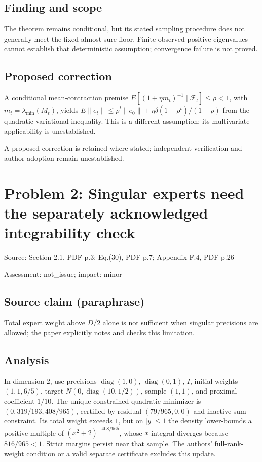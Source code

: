 \documentclass[11pt]{article}
\begin{document}
\subsection*{Finding and scope}

The theorem remains conditional, but its stated sampling procedure does not generally meet the fixed almost-sure floor. Finite observed positive eigenvalues cannot establish that deterministic assumption; convergence failure is not proved.

\subsection*{Proposed correction}

A conditional mean-contraction premise \(E[(1+\eta m_t)^{-1}\mid\mathcal F_t]\le\rho<1\), with \(m_t=\lambda_{\min}(M_t)\), yields \(E\|e_t\|\le\rho^t\|e_0\|+\eta\delta(1-\rho^t)/(1-\rho)\) from the quadratic variational inequality. This is a different assumption; its multivariate applicability is unestablished.

A proposed correction is retained where stated; independent verification and author adoption remain unestablished.

\section*{Problem 2: Singular experts need the separately acknowledged integrability check}

Source: Section 2.1, PDF p.3; Eq.(30), PDF p.7; Appendix F.4, PDF p.26

Assessment: not\_issue; impact: minor

\subsection*{Source claim (paraphrase)}

Total expert weight above \(D/2\) alone is not sufficient when singular precisions are allowed; the paper explicitly notes and checks this limitation.

\subsection*{Analysis}

In dimension \(2\), use precisions \(\operatorname{diag}(1,0)\), \(\operatorname{diag}(0,1)\), \(I\), initial weights \((1,1,6/5)\), target \(N(0,\operatorname{diag}(10,1/2))\), sample \((1,1)\), and proximal coefficient \(1/10\). The unique constrained quadratic minimizer is \((0,319/193,408/965)\), certified by residual \((79/965,0,0)\) and inactive sum constraint. Its total weight exceeds \(1\), but on \(|y|\le1\) the density lower-bounds a positive multiple of \((x^2+2)^{-408/965}\), whose \(x\)-integral diverges because \(816/965<1\). Strict margins persist near that sample. The authors’ full-rank-weight condition or a valid separate certificate excludes this update.
\end{document}
